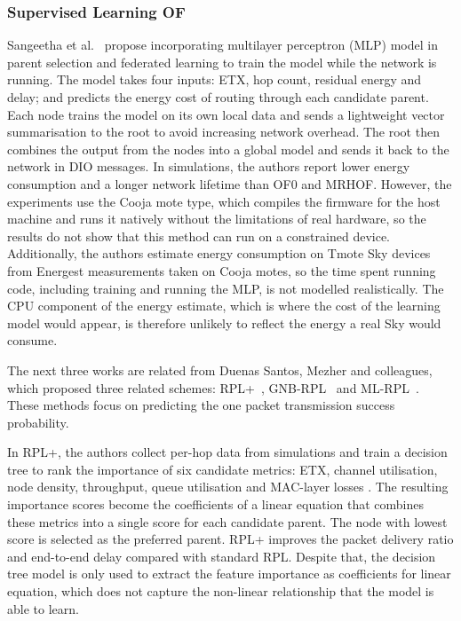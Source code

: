 \subsubsection{Supervised Learning OF}
Sangeetha et al.~\cite{sangeethaFederatedLearningBasedParent2025}
propose incorporating multilayer perceptron (MLP)
model in parent selection and
federated learning to train the model while the
network is running. The model takes four inputs: ETX, hop count,
residual energy and delay; and predicts the energy cost of routing
through each candidate parent. Each node trains the model on its own
local data and sends a lightweight
vector summarisation to the root to avoid increasing network
overhead. The root then combines the output from the nodes
into a global model and sends it back to the network in DIO messages.
In simulations, the authors report lower energy consumption and a longer network
lifetime than OF0 and MRHOF. However, the experiments use the Cooja
mote type, which compiles the firmware for the host machine and runs it natively
without the limitations of real hardware, so the results do not show
that this method can run on a constrained device.
Additionally, the authors estimate energy consumption on Tmote Sky devices
from Energest measurements taken on Cooja motes, so the time spent running
code, including training and running the MLP, is not modelled
realistically. The CPU component of the energy estimate, which is
where the cost of the learning model would appear, is therefore
unlikely to reflect the energy a real Sky would consume.

The next three works are related from Duenas Santos, Mezher and
colleagues, which proposed three related
schemes: RPL+~\cite{duenassantosRPLImprovedParent2022},
GNB-RPL~\cite{mezherGNBRPLGaussianNaive2023} and
ML-RPL~\cite{santosMLRPLMachineLearningBased2023}. These methods
focus on predicting the one packet transmission success probability.

In RPL+, the authors collect per-hop data from simulations and train
a decision tree to rank the importance of six candidate metrics: ETX,
channel utilisation, node density, throughput, queue utilisation and
MAC-layer losses \cite{duenassantosRPLImprovedParent2022}. The
resulting importance scores become the
coefficients of a linear equation that combines these metrics into a
single score for each candidate parent. The node with lowest score is
selected as the preferred parent.
RPL+ improves the packet delivery ratio and
end-to-end delay compared with standard RPL. Despite that, the decision tree
model is only used to extract the feature importance as coefficients for
linear equation, which does not capture the non-linear relationship
that the model is able to learn.

